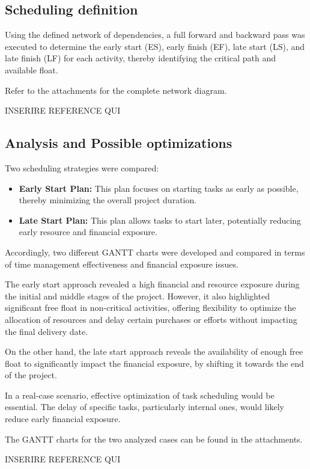 \subsection{Scheduling definition}
Using the defined network of dependencies, a full forward and backward pass was executed to determine the early start (ES), early finish (EF), late start (LS), and late finish (LF) for each activity, thereby identifying the critical path and available float.

Refer to the attachments for the complete network diagram.

INSERIRE REFERENCE QUI

\subsection{Analysis and Possible optimizations}
Two scheduling strategies were compared:
\begin{itemize}
    \item \textbf{Early Start Plan:} This plan focuses on starting tasks as early as possible, thereby minimizing the overall project duration.
    \item \textbf{Late Start Plan:} This plan allows tasks to start later, potentially reducing early resource and financial exposure.
\end{itemize}

Accordingly, two different GANTT charts were developed and compared in terms of time management effectiveness and financial exposure issues.

The early start approach revealed a high financial and resource exposure during the initial and middle stages of the project. However, it also highlighted significant free float in non-critical activities, offering flexibility to optimize the allocation of resources and delay certain purchases or efforts without impacting the final delivery date.

On the other hand, the late start approach reveals the availability of enough free float to significantly impact the financial exposure, by shifting it towards the end of the project.

In a real-case scenario, effective optimization of task scheduling would be essential. The delay of specific tasks, particularly internal ones, would likely reduce early financial exposure.

The GANTT charts for the two analyzed cases can be found in the attachments.

INSERIRE REFERENCE QUI

